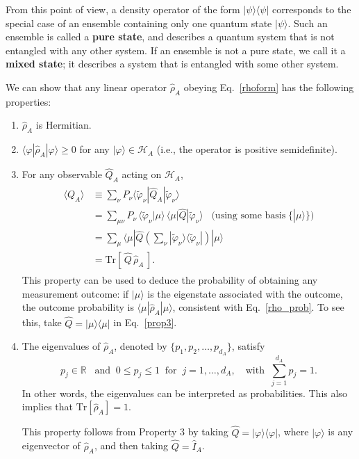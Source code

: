 \documentclass[pra,12pt]{revtex4}
\begin{document}
From this point of view, a density operator of the form
$|\psi\rangle\langle\psi|$ corresponds to the special case of an
ensemble containing only one quantum state $|\psi\rangle$.  Such an
ensemble is called a \textbf{pure state}, and describes a quantum
system that is not entangled with any other system.  If an ensemble is
not a pure state, we call it a \textbf{mixed state}; it describes a
system that is entangled with some other system.

We can show that any linear operator $\hat{\rho}_A$ obeying
Eq.~\eqref{rhoform} has the following properties:
\begin{enumerate}
\item $\hat{\rho}_A$ is Hermitian.

\item $\langle\varphi|\hat{\rho}_A|\varphi\rangle \ge 0$ for any
  $|\varphi\rangle \in \mathscr{H}_A$ (i.e., the operator is positive
  semidefinite).

\item For any observable $\hat{Q}_A$ acting on $\mathscr{H}_A$,
  \begin{align}
    \begin{aligned}
      \langle Q_A \rangle
      &\equiv \sum_\nu P_\nu
      \langle \tilde{\varphi}_\nu|\hat{Q}_A|\tilde{\varphi}_\nu\rangle \\
      &= \sum_{\mu\nu} P_\nu\,
      \langle \tilde{\varphi}_\nu|\mu\rangle \,
      \langle\mu|\hat{Q}|\tilde{\varphi}_\nu\rangle
      \;\;\;\big(\textrm{using some basis} \;\{|\mu\rangle\}\big) \\
      &= \sum_\mu
      \langle\mu|\hat{Q} \left(\sum_\nu |\tilde{\varphi}_\nu\rangle
      \langle \tilde{\varphi}_\nu|\right) |\mu\rangle \\
      &= \mathrm{Tr}\left[\,\hat{Q} \,\hat{\rho}_A\,\right].
    \end{aligned}
    \label{prop3}
  \end{align}
  This property can be used to deduce the probability of obtaining any
  measurement outcome: if $|\mu\rangle$ is the eigenstate associated
  with the outcome, the outcome probability is
  $\langle\mu|\hat\rho_A|\mu\rangle$, consistent with
  Eq.~\eqref{rho_prob}.  To see this, take $\hat{Q} = |\mu\rangle
  \langle \mu|$ in Eq.~\eqref{prop3}.
  
\item The eigenvalues of $\hat{\rho}_A$, denoted by $\{p_1, p_2,
  \dots, p_{d_A}\}$, satisfy
  \begin{equation}
    p_j \in \mathbb{R} \;\;\;\mathrm{and}\;\; 0 \le p_j \le 1 \;\;
    \mathrm{for}\;\; j = 1,\dots,d_A,
    \quad\mathrm{with}\;\; \sum_{j=1}^{d_A} p_j = 1.
    \label{trrho_reduced}    
  \end{equation}
  In other words, the eigenvalues can be interpreted as probabilities.
  This also implies that $\mathrm{Tr}[\hat\rho_A] = 1$.

  This property follows from Property 3 by taking $\hat{Q} =
  |\varphi\rangle\langle\varphi|$, where $|\varphi\rangle$ is any
  eigenvector of $\hat\rho_A$, and then taking $\hat{Q} = \hat{I}_A$.
\end{enumerate}
\end{document}
